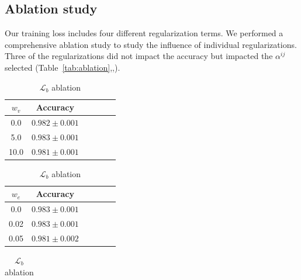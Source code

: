 \documentclass[../main.tex]{subfiles}
\begin{document}
 \subsection{Ablation study}
     Our training loss includes four different regularization terms.
     We performed a comprehensive ablation study to study the influence of individual regularizations.
     Three of the regularizations did not impact the accuracy but impacted the \(\alpha^{ij}\) selected (Table~\ref{tab:ablation},,).
     \begin{table}[htbp]
         \caption{Results of the ablation study of the four regularization terms.}
         \begin{subtable}[h]{0.2\textwidth}
             \centering
             \caption{\(\mathcal{L}_v\) ablation}
             \begin{tabular}{cccccc}
                 \toprule
                 \(w_v\) & Accuracy            \\
                 \midrule
                 0.0     & \(0.982 \pm 0.001\) \\
                 5.0     & \(0.983 \pm 0.001\) \\
                 10.0    & \(0.981 \pm 0.001\) \\
                 \bottomrule
             \end{tabular}
             \label{tab:ablation_wv}
         \end{subtable}
         \hfill
         \begin{subtable}[h]{0.2\textwidth}
             \centering
             \caption{\(\mathcal{L}_e\) ablation}
             \begin{tabular}{cccccc}
                 \toprule
                 \(w_e\) & Accuracy            \\
                 \midrule
                 0.0     & \(0.983 \pm 0.001\) \\
                 0.02    & \(0.983 \pm 0.001\) \\
                 0.05    & \(0.981 \pm 0.002\) \\
                 \bottomrule
             \end{tabular}
             \label{tab:ablation_we}
         \end{subtable}
         \hfill
         \begin{subtable}[h]{0.2\textwidth}
             \centering
             \caption{\(\mathcal{L}_b\) ablation}
             \begin{tabular}{cccccc}

\end{tabular}
\end{subtable}
\end{table}
\end{document}
